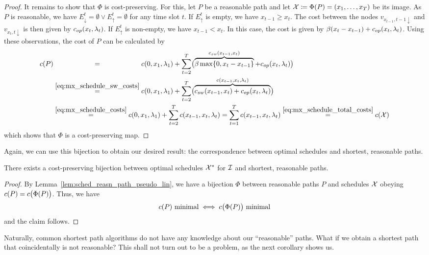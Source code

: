 \begin{proof}
It remains to show that $\Phi$ is cost-preserving. For this, let $P$ be a reasonable path and let $\mathcal{X}\coloneqq\Phi(P)=(x_1,\dotsc,x_T)$ be its image. 
As $P$ is reasonable, we have $E_\downarrow^t=\emptyset \lor E_\uparrow^t=\emptyset$ for any time slot $t$. If $E_\uparrow^t$ is empty, we have $x_{t-1}\ge x_t$. The cost between the nodes $v_{x_{t-1},t-1\downarrow}$ and $v_{x_t,t\downarrow}$ is then given by $c_{op}(x_t,\lambda_t)$. If $E_\uparrow^t$ is non-empty, we have $x_{t-1}<x_t$. In this case, the cost is given by $\beta(x_t-x_{t-1})+c_{op}(x_t,\lambda_t)$. Using these observations, the cost of $P$ can be calculated by 
\begin{align*}
	\costs(P)&\stackrel{\phantom{\eqref{eq:mx_schedule_sw_costs}}}{=}\costs(0,x_1,\lambda_1)+\sum\limits_{t=2}^{T}\bigl(\overbrace{\beta\max\{0,x_t-x_{t-1}\}}^{\swcosts(x_{t-1},x_t)}+\opcosts(x_{t},\lambda_t)\bigr)\\
	&\stackrel{\eqref{eq:mx_schedule_sw_costs}}{=}c(0,x_1,\lambda_1)+\sum\limits_{t=2}^{T}\bigl(\overbrace{\swcosts(x_{t-1},x_t)+\opcosts(x_{t},\lambda_t)}^{\costs(x_{t-1},x_t,\lambda_t)}\bigr)\\
	&\stackrel{\eqref{eq:mx_schedule_costs}}{=}c(0,x_1,\lambda_1)+\sum\limits_{t=2}^{T}\costs(x_{t-1},x_t,\lambda_t)=\sum\limits_{t=1}^{T}\costs(x_{t-1},x_t,\lambda_t)\stackrel{\eqref{eq:mx_schedule_total_costs}}{=}c(\mx)
\end{align*}
which shows that $\Phi$ is a cost-preserving map.
\end{proof}
Again, we can use this bijection to obtain our desired result: the correspondence between optimal schedules and shortest, reasonable paths.
\begin{thm}\label{thm:opt_sched_reasn_path}
There exists a cost-preserving bijection between optimal schedules $\mathcal{X}^*$ for $\mathcal{I}$ and shortest, reasonable paths.
\end{thm} 
\begin{proof}
By Lemma~\ref{lem:sched_reasn_path_pseudo_lin}, we have a bijection $\Phi$ between reasonable paths $P$ and schedules $\mathcal{X}$ obeying $c(P)=c\bigl(\Phi(P)\bigr)$. Thus, we have 
\begin{equation*}
	c(P)\text{ minimal}\iff c\bigl(\Phi(P)\big)\text{ minimal}
\end{equation*}
and the claim follows.
\end{proof}
Naturally, common shortest path algorithms do not have any knowledge about our ``reasonable'' paths. What if we obtain a shortest path that coincidentally is not reasonable? This shall not turn out to be a problem, as the next corollary shows us.
